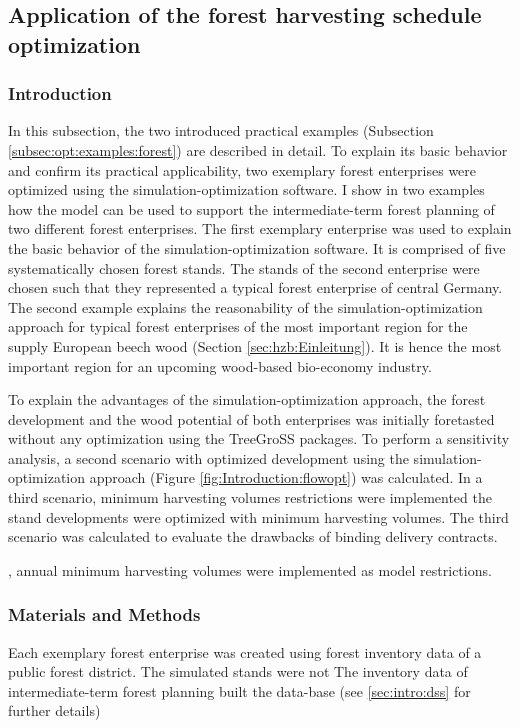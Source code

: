 \subsection{Application of the forest harvesting schedule optimization}
\label{subsec:discussion:struct:opt:application}
\subsubsection{Introduction}
\label{subsubsec:discussion:struct:opt:application:introduction}
In this subsection, the two introduced practical examples (Subsection \ref{subsec:opt:examples:forest}) are described in detail. To explain its basic behavior and confirm its practical applicability, two exemplary forest enterprises were optimized using the si\-mu\-la\-tion-op\-ti\-mi\-za\-tion software. I show in two examples how the model can be used to support the intermediate-term forest planning of two different forest enterprises. The first exemplary enterprise was used to explain the basic behavior of the simulation-optimization software. It is comprised of five systematically chosen forest stands. The stands of the second enterprise were chosen such that they represented a typical forest enterprise of central Germany. The second example explains the reasonability of the simulation-optimization approach for typical forest enterprises of the most important region for the supply European beech wood (Section \ref{sec:hzb:Einleitung}). It is hence the most important region for an upcoming wood-based bio-economy industry.

To explain the advantages of the simulation-optimization approach, the forest development and the wood potential of both enterprises was initially foretasted without any optimization using the TreeGroSS packages. To perform a sensitivity analysis, a second scenario with optimized development using the simulation-optimization approach (Figure \ref{fig:Introduction:flowopt}) was calculated. In a third scenario, minimum harvesting volumes restrictions were implemented 
 the stand developments were optimized with minimum harvesting volumes. The third scenario was calculated to evaluate the drawbacks of binding delivery contracts.

, annual minimum harvesting volumes were implemented as model restrictions.

\subsubsection{Materials and Methods}
\label{subsubsec:discussion:struct:opt:application:method}
Each exemplary forest enterprise was created using forest inventory data of a public forest district. The simulated stands were not 
The inventory data of intermediate-term forest planning built the data-base
 (see \ref{sec:intro:dss} for further details)
 
